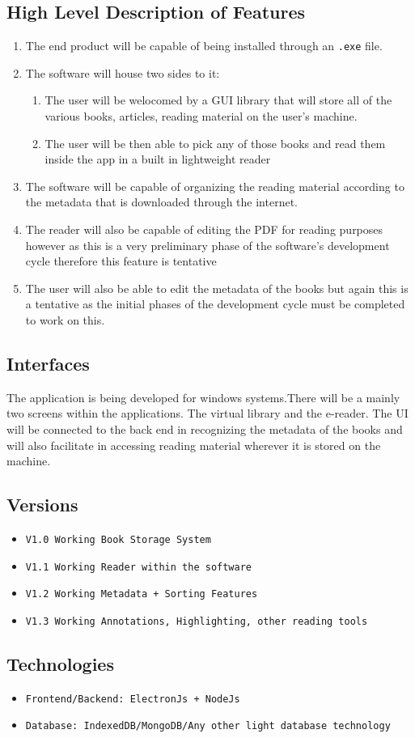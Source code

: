 \documentclass[answers]{exam}
\begin{document}
\subsection{High Level Description of Features}
\begin{enumerate}
    \item The end product will be capable of being installed through an \texttt{.exe} file. 
    \item The software will house two sides to it:
    \begin{enumerate}
        \item The user will be welocomed by a GUI library that will store all of the various books, articles, reading material on the user's machine. 
        \item The user will be then able to pick any of those books and read them inside the app in a built in lightweight reader
    \end{enumerate}
    \item The software will be capable of organizing the reading material according to the metadata that is downloaded through the internet.

    \item The reader will also be capable of editing the PDF for reading purposes however as this is a very preliminary phase of the software's development cycle therefore this feature is tentative
    \item The user will also be able to edit the metadata of the books but again this is a tentative as the initial phases of the development cycle must be completed to work on this.

    
\end{enumerate}
\subsection{Interfaces}
The application is being developed for windows systems.There will be a mainly two  screens within the applications. The virtual library and the e-reader. The UI will be connected to the back end in recognizing the metadata of the books and will also facilitate in accessing reading material wherever it is stored on the machine. 
\subsection{Versions}
\begin{itemize}
    \item \texttt{V1.0 Working Book Storage System}
    \item \texttt{V1.1 Working Reader within the software}
    \item \texttt{V1.2 Working Metadata + Sorting Features}
    \item \texttt{V1.3 Working Annotations, Highlighting, other reading tools}
\end{itemize}
\subsection{Technologies}
\begin{itemize}
    \item \texttt{Frontend/Backend: ElectronJs + NodeJs}
    \item \texttt{Database: IndexedDB/MongoDB/Any other light database technology}

\end{itemize}
\end{document}
